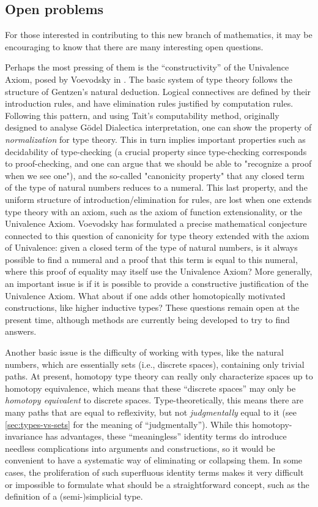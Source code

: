 \subsection*{Open problems} 

For those interested in contributing to this new branch of mathematics, it may be encouraging to know that there are many interesting open questions.

Perhaps the most pressing of them is the ``constructivity'' of the Univalence Axiom, posed by Voevodsky in \cite{Vo2012}.
The basic system of type theory follows the structure of Gentzen's natural deduction. Logical connectives are defined by their introduction rules, and have elimination rules justified by computation rules. Following this pattern, and using Tait's computability method, originally designed to analyse G\"odel Dialectica interpretation, one can show the property of {\em normalization} for type theory. This in turn implies important properties such as decidability of type-checking (a crucial property since type-checking corresponds to proof-checking, and one can argue that we should be able to "recognize a proof when we see one"), and the so-called "canonicity property" that any closed term of the type of natural numbers reduces to a numeral. This last property, and the uniform structure of introduction/elimination for rules, are lost when one extends type theory with an axiom, such as the axiom of function extensionality, or the Univalence Axiom. Voevodsky has formulated a precise mathematical conjecture connected to this question of canonicity for type theory extended with the axiom of Univalence: given a closed term of the type of natural numbers, is it always possible to find a numeral and a proof that this term is equal to this numeral, where this proof of equality may itself use the Univalence Axiom? More generally, an important issue is if it is possible to provide a constructive justification of the Univalence Axiom.
What about if one adds other homotopically motivated constructions, like higher inductive types?
These questions remain open at the present time, although methods are currently being developed to try to find answers.

Another basic issue is the difficulty of working with types, like the natural numbers, which are essentially sets (i.e., discrete spaces), containing only trivial paths.
At present, homotopy type theory can really only characterize spaces up to homotopy equivalence, which means that these ``discrete spaces'' may only be \emph{homotopy equivalent} to discrete spaces.
Type-theoretically, this means there are many paths that are equal to reflexivity, but not \emph{judgmentally} equal to it (see \cref{sec:types-vs-sets} for the meaning of ``judgmentally'').
While this homotopy-invariance has advantages, these ``meaningless'' identity terms do introduce needless complications into arguments and constructions, so it would be convenient to have a systematic way of eliminating or collapsing them.
In some cases, the proliferation of such superfluous identity terms makes it very difficult or impossible to formulate what should be a straightforward concept, such as the definition of a (semi-)simplicial type.

